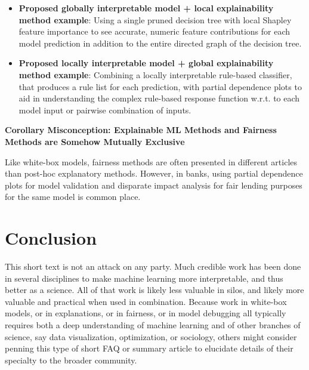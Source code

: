 \documentclass{article}
\begin{document}
\begin{itemize}
\item \textbf{Proposed globally interpretable model + local explainability method example}: Using a single pruned decision tree with local Shapley feature importance to see accurate, numeric feature contributions for each model prediction in addition to the entire directed graph of the decision tree.
\item \textbf{Proposed locally interpretable model + global explainability method example}: Combining a locally interpretable rule-based classifier, that produces a rule list for each prediction, with partial dependence plots to aid in understanding the complex rule-based response function w.r.t. to each model input or pairwise combination of inputs.  
\end{itemize}

\textbf{Corollary Misconception: Explainable ML Methods and Fairness Methods are Somehow Mutually Exclusive}

Like white-box models, fairness methods are often presented in different articles than post-hoc explanatory methods. However, in banks, using partial dependence plots for model validation and disparate impact analysis for fair lending purposes for the same model is common place.

\section{Conclusion}

This short text is not an attack on any party. Much credible work has been done in several disciplines to make machine learning more interpretable, and thus better as a science. All of that work is likely less valuable in silos, and likely more valuable and practical when used in combination. Because work in white-box models, or in explanations, or in fairness, or in model debugging all typically requires both a deep understanding of machine learning and of other branches of science, say data visualization, optimization, or sociology, others might consider penning this type of short FAQ or summary article to elucidate details of their specialty to the broader community.    




\end{document}
